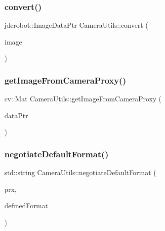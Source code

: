 \mbox{\label{class_camera_utils_a38071971e6fec4d3786223ebd972e778}} 
\subsubsection{\texorpdfstring{convert()}{convert()}}
{\footnotesize\ttfamily jderobot\+::\+Image\+Data\+Ptr Camera\+Utils\+::convert (\begin{DoxyParamCaption}\item[{const cv\+::\+Mat \&}]{image }\end{DoxyParamCaption})\hspace{0.3cm}{\ttfamily [static]}}

\mbox{\label{class_camera_utils_a926f945480f84f9a2078cfd651b15c33}} 
\subsubsection{\texorpdfstring{get\+Image\+From\+Camera\+Proxy()}{getImageFromCameraProxy()}}
{\footnotesize\ttfamily cv\+::\+Mat Camera\+Utils\+::get\+Image\+From\+Camera\+Proxy (\begin{DoxyParamCaption}\item[{jderobot\+::\+Image\+Data\+Ptr}]{data\+Ptr }\end{DoxyParamCaption})\hspace{0.3cm}{\ttfamily [static]}}

\mbox{\label{class_camera_utils_a4eb121d34116f081d07a7cbf6994b43e}} 
\subsubsection{\texorpdfstring{negotiate\+Default\+Format()}{negotiateDefaultFormat()}}
{\footnotesize\ttfamily std\+::string Camera\+Utils\+::negotiate\+Default\+Format (\begin{DoxyParamCaption}\item[{jderobot\+::\+Camera\+Prx}]{prx,  }\item[{const std\+::string \&}]{defined\+Format }\end{DoxyParamCaption})\hspace{0.3cm}{\ttfamily [static]}}



